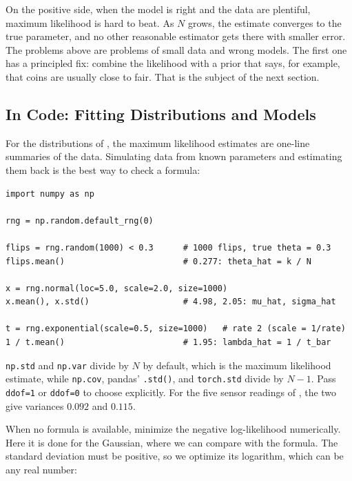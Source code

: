 On the positive side, when the model is right and the data are
plentiful, maximum likelihood is hard to beat. As $N$ grows, the
estimate converges to the true parameter, and no other reasonable
estimator gets there with smaller error. The problems above are
problems of small data and wrong models. The first one has a principled
fix: combine the likelihood with a prior that says, for example, that
coins are usually close to fair. That is the subject of the next
section.

\subsection{In Code: Fitting Distributions and Models}
\label{sec:ch06-mle-code}

For the distributions of , the maximum
likelihood estimates are one-line summaries of the data. Simulating data
from known parameters and estimating them back is the best way to check
a formula:

\begin{lstlisting}
import numpy as np

rng = np.random.default_rng(0)

flips = rng.random(1000) < 0.3      # 1000 flips, true theta = 0.3
flips.mean()                        # 0.277: theta_hat = k / N

x = rng.normal(loc=5.0, scale=2.0, size=1000)
x.mean(), x.std()                   # 4.98, 2.05: mu_hat, sigma_hat

t = rng.exponential(scale=0.5, size=1000)   # rate 2 (scale = 1/rate)
1 / t.mean()                        # 1.95: lambda_hat = 1 / t_bar
\end{lstlisting}

\begin{warning}
  \texttt{np.std} and \texttt{np.var} divide by $N$ by default, which is
  the maximum likelihood estimate, while \texttt{np.cov}, pandas'
  \texttt{.std()}, and \texttt{torch.std} divide by $N - 1$. Pass
  \texttt{ddof=1} or \texttt{ddof=0} to choose explicitly. For the five
  sensor readings of , the two give variances
  $0.092$ and $0.115$.
\end{warning}

When no formula is available, minimize the negative log-likelihood
numerically. Here it is done for the Gaussian, where we can compare with
the formula. The standard deviation must be positive, so we optimize its
logarithm, which can be any real number:

